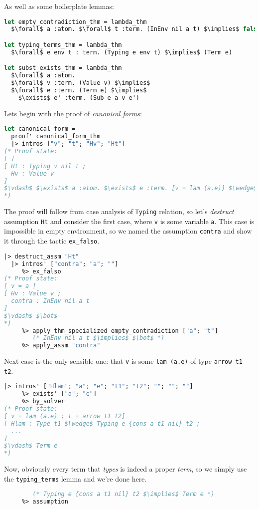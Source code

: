 \documentclass[english, mgr]{iithesis}
\renewcommand{\tt}[1]{\texttt{\small{#1}}}
\renewcommand{\it}[1]{\textit{#1}}
\begin{document}
As well as some boilerplate lemmas:
\begin{lstlisting}[mathescape,language=OCaml]
let empty_contradiction_thm = lambda_thm
  $\forall$ a :atom. $\forall$ t :term. (InEnv nil a t) $\implies$ false

let typing_terms_thm = lambda_thm
  $\forall$ e env t : term. (Typing e env t) $\implies$ (Term e)

let subst_exists_thm = lambda_thm
  $\forall$ a :atom.
  $\forall$ v :term. (Value v) $\implies$
  $\forall$ e :term. (Term e) $\implies$
    $\exists$ e' :term. (Sub e a v e')
\end{lstlisting}
Lets begin with the proof of \it{canonical forms}:
\begin{lstlisting}[mathescape,language=OCaml]
let canonical_form =
  proof' canonical_form_thm
  |> intros ["v"; "t"; "Hv"; "Ht"]
(* Proof state:
[ ]
[ Ht : Typing v nil t ;
  Hv : Value v
]
$\vdash$ $\exists$ a :atom. $\exists$ e :term. [v = lam (a.e)] $\wedge$ Term e
*)
\end{lstlisting}
The proof will follow from case analysis of \tt{Typing} relation, so let's \it{destruct} assumption \tt{Ht}
and consider the first case, where \tt{v} is some variable \tt{a}.
This case is impossible in empty environment, so we named the assumption \tt{contra}
and show it through the tactic \tt{ex\_falso}.
\begin{lstlisting}[mathescape,language=OCaml]
  |> destruct_assm "Ht"
  |> intros' ["contra"; "a"; ""]
     %> ex_falso
(* Proof state:
[ v = a ]
[ Hv : Value v ;
  contra : InEnv nil a t
]
$\vdash$ $\bot$
*)
     %> apply_thm_specialized empty_contradiction ["a"; "t"]
        (* InEnv nil a t $\implies$ $\bot$ *)
     %> apply_assm "contra"
\end{lstlisting}
Next case is the only sensible one: that \tt{v} is some \tt{lam (a.e)} of type \tt{arrow t1 t2}.
\begin{lstlisting}[mathescape,language=OCaml]
  |> intros' ["Hlam"; "a"; "e"; "t1"; "t2"; ""; ""; ""]
     %> exists' ["a"; "e"]
     %> by_solver
(* Proof state:
[ v = lam (a.e) ; t = arrow t1 t2]
[ Hlam : Type t1 $\wedge$ Typing e {cons a t1 nil} t2 ;
  ...
]
$\vdash$ Term e
*)
\end{lstlisting}
Now, obviously every term that \it{types} is indeed a proper \it{term},
so we simply use the \tt{typing\_terms} lemma and we're done here.
\begin{lstlisting}[mathescape,language=OCaml]
     %> apply_thm_specialized typing_terms ["e"; "cons a t1 nil"; "t2"]
        (* Typing e {cons a t1 nil} t2 $\implies$ Term e *)
     %> assumption
\end{lstlisting}
\end{document}
